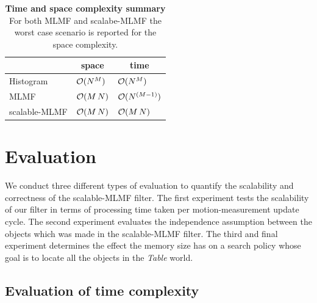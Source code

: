 
\begin{table}
 \centering
 \begin{tabular}{c|c|c|}
\cline{2-3}
				        &    \textbf{space}   &     \textbf{time} \\ \hline
    \multicolumn{1}{|l}{Histogram}      & \multicolumn{1}{|l}{$\operatorname{\mathcal{O}}(N^M)$}   &  \multicolumn{1}{|l|}{$\operatorname{\mathcal{O}}(N^M)$}      \\ \hline
    \multicolumn{1}{|l}{MLMF}           & \multicolumn{1}{|l}{$\operatorname{\mathcal{O}}(M\,N)$}  &  \multicolumn{1}{|l|}{$\operatorname{\mathcal{O}}(N^{(M-1)})$} \\ \hline
    \multicolumn{1}{|l}{scalable-MLMF}  & \multicolumn{1}{|l}{$\operatorname{\mathcal{O}}(M\,N)$}  &  \multicolumn{1}{|l|}{$\operatorname{\mathcal{O}}(M\,N)$}     \\ \hline
   \end{tabular}
   \caption{\textbf{Time and space complexity summary} For both MLMF and scalabe-MLMF the worst case scenario is reported for the space complexity.}
   \label{tab:time_space_summary}
\end{table}



\section{Evaluation}\label{ch5:evaluation}

We conduct three different types of evaluation to quantify the scalability and correctness of the scalable-MLMF filter. The first experiment
tests the scalability of our filter in terms of processing time taken per motion-measurement update cycle. The second experiment evaluates the independence 
assumption between the objects which was made in the scalable-MLMF filter. The third and final experiment determines the effect the memory size has 
on a search policy whose goal is to locate all the objects in the \textit{Table} world.

\subsection{Evaluation of time complexity}

